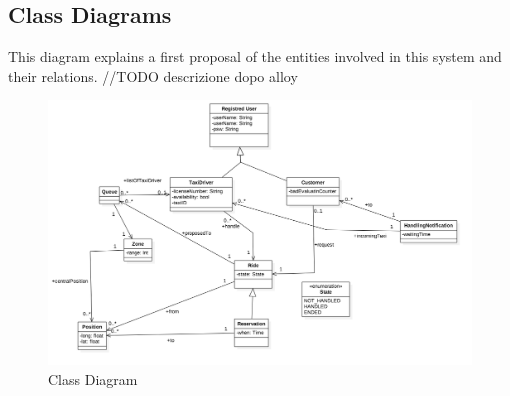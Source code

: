 \subsection{Class Diagrams}
	This diagram explains a first proposal of the entities involved in this system and their relations. //TODO descrizione dopo alloy

				\begin{figure}[H]
					\centering
					\includegraphics[width=\textwidth, scale=0.5]{IMG/ClassDiagram.png}
					\caption{Class Diagram}\label{sec:ClassDiagramFigure}
				\end{figure}
